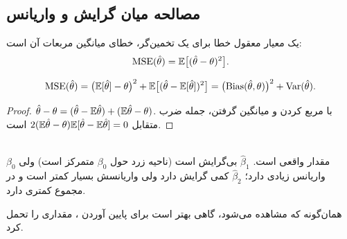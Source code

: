 \subsection{مصالحه میان گرایش و واریانس }
یک معیار معقول خطا برای یک تخمین‌گر، خطای میانگین مربعات آن است:
\[
\mathrm{MSE}(\hat\theta)=\mathbb{E}\big[(\hat\theta-\theta)^2\big].
\]
\begin{theorem}
\[
\mathrm{MSE}(\hat\theta)=\big(\mathbb{E}[\hat\theta]-\theta\big)^2+\mathbb{E}\big[(\hat\theta-\mathbb{E}[\hat\theta])^2\big]=\big(\mathrm{Bias}(\hat\theta,\theta)\big)^2+\operatorname{Var}(\hat\theta).
\]
\end{theorem}
\begin{proof}
$\hat\theta-\theta=(\hat\theta-\mathbb{E}\hat\theta)+(\mathbb{E}\hat\theta-\theta)$. با مربع کردن و میانگین گرفتن، جمله ضرب متقابل $2(\mathbb{E}\hat\theta-\theta)\mathbb{E}[\hat\theta-\mathbb{E}\hat\theta]=0$ است.
\end{proof}

\begin{center}
\\
{\small $\beta_0$ مقدار واقعی است. $\hat\beta_1$ بی‌گرایش است (ناحیه زرد حول $\beta_0$ متمرکز است) ولی واریانس زیادی دارد؛ $\hat\beta_2$ کمی گرایش دارد ولی واریانسش بسیار کمتر است و در مجموع  کمتری دارد.}
\end{center}

همان‌گونه که مشاهده می‌شود، گاهی بهتر است برای پایین آوردن ، مقداری  را تحمل کرد.

